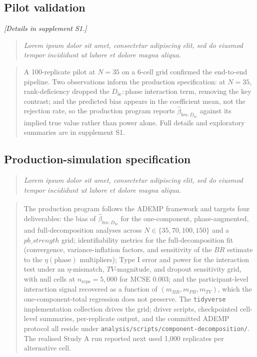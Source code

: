 \documentclass[
  11pt,
]{article}
\newenvironment{rgt}{%
  \begin{quote}\small\itshape\color[RGB]{20,60,160}}{%
  \end{quote}}
\newenvironment{orig}{%
  \begin{quote}\normalsize\color[gray]{0.55}}{%
  \end{quote}}
\begin{document}
\subsection{Pilot validation}\label{pilot-validation}

\emph{{[}Details in supplement S1.{]}}

\begin{rgt}
Lorem ipsum dolor sit amet, consectetur adipiscing elit, sed do eiusmod tempor incididunt ut labore et dolore magna aliqua.

\end{rgt}

\begin{orig}
A 100-replicate pilot at \(N = 35\) on a 6-cell grid confirmed the
end-to-end pipeline. Two observations inform the production
specification: at \(N = 35\), rank-deficiency dropped the
\(D_{bc}{:}\text{phase}\) interaction term, removing the key
contrast; and the predicted bias appears in the coefficient
mean, not the rejection rate, so the production program
reports \(\hat\beta_{bm:D_{bc}}\) against its implied true value
rather than power alone. Full details and exploratory summaries
are in supplement S1.

\end{orig}

\subsection{Production-simulation specification}\label{production-simulation-specification}

\begin{rgt}
Lorem ipsum dolor sit amet, consectetur adipiscing elit, sed do eiusmod tempor incididunt ut labore et dolore magna aliqua.

\end{rgt}

\begin{orig}
The production program follows the\textsuperscript{} ADEMP framework and
targets four deliverables: the bias of \(\hat\beta_{bm:D_{bc}}\) for the
one-component, phase-augmented, and full-decomposition analyses across
\(N \in \{35,70,100,150\}\) and a \(pb\_strength\) grid; identifiability
metrics for the full-decomposition fit (convergence, variance-inflation
factors, and sensitivity of the \(BR\) estimate to the
\(\eta(\text{phase})\) multipliers); Type I error and power for the
interaction test under an \(\eta\)-mismatch, \(TV\)-magnitude, and dropout
sensitivity grid, with null cells at \(n_{\text{reps}} = 5{,}000\) for
MCSE \(0.003\); and the participant-level interaction signal recovered as
a function of \((m_{BR}, m_{PB}, m_{TV})\), which the one-component-total
regression does not preserve. The \texttt{tidyverse} implementation
collection drives the grid; driver scripts, checkpointed cell-level
summaries, per-replicate output, and the committed ADEMP
protocol all reside under
\texttt{analysis/scripts/component-decomposition/}. The realised Study A
run reported next used 1,000 replicates per alternative cell.

\end{orig}
\end{document}

